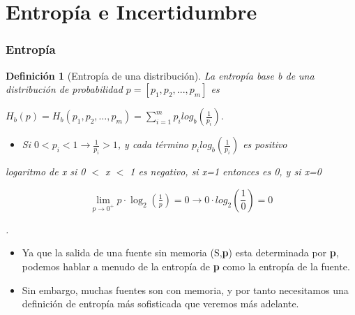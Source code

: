 \documentclass{beamer}
\newtheorem{definicion} [Definicion]{Definición}
\begin{document}
\section{Entropía e Incertidumbre}


\begin{frame} \frametitle{Entropía} \small

\begin{definicion}[Entropía de una distribución]

La entropía base b de una distribución de probabilidad $p = [p_1, p_2, . . . , p_m]$ es 

\begin{center}
$H_b(p) = H_b(p_1,p_2,\ldots,p_m) = \sum^{m}_{i=1} p_i log_b(\frac{1}{p_i}).$
\end{center}

\begin{itemize}
\item
Si $0 < p_i < 1 \rightarrow \frac{1}{p_i} > 1$, y cada término $p_i log_b(\frac{1}{p_i})$ es positivo 
\end{itemize}
\begin{center}
    \tiny{logaritmo de x si 0 $<$ x $<$ 1 es negativo, 
    si x=1 entonces es 0, y si x=0 
    
    \[
\lim_{p \to 0^+} p \cdot \log_{2}\!\left(\tfrac{1}{p}\right) = 0 \rightarrow 0 \cdot log_2(\frac{1}{0})=0
\]}.

\end{center}


\end{definicion}

\begin{itemize}
\item Ya que la salida de una fuente sin memoria (S,\textbf{p}) esta determinada por \textbf{p}, podemos hablar a menudo de la entropía de \textbf{p} como la entropía de la fuente. 

\item Sin embargo, muchas fuentes son con memoria, y por tanto necesitamos una definición de entropía más sofisticada que veremos más adelante.
\end{itemize}

\end{frame} 
\end{document}
